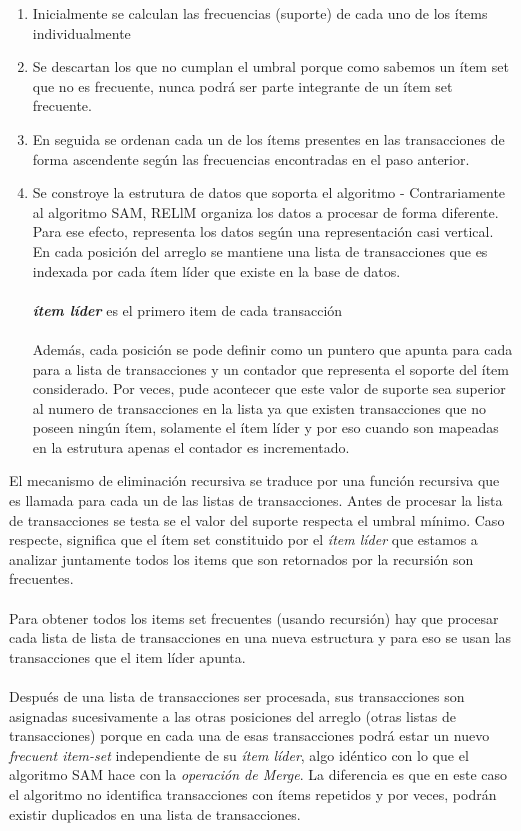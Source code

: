 \documentclass[12pt,spanish]{article}
\begin{document}
\begin{enumerate}
\item Inicialmente se calculan las frecuencias (suporte) de cada uno de los ítems individualmente 
\item Se descartan los que no cumplan el umbral porque como sabemos un ítem set que no es frecuente, nunca podrá ser parte integrante de un ítem set frecuente.
\item En seguida se ordenan cada un de los ítems presentes en las transacciones de forma ascendente según las frecuencias encontradas en el paso anterior.
\item Se constroye la estrutura de datos que soporta el algoritmo -
Contrariamente al algoritmo SAM, RELlM organiza los datos a procesar de forma diferente. Para ese efecto, representa los datos según una representación casi vertical. En cada posición del arreglo se mantiene una lista de transacciones que es indexada por cada ítem líder que existe en la base de datos.
\\\\
\textbf{\emph{ítem líder}} es el primero item de cada transacción
\\\\
 Además, cada posición se pode definir como un puntero que apunta para cada para a lista de transacciones y un contador que representa el soporte del ítem considerado. Por veces, pude acontecer que este valor de suporte sea superior al numero de transacciones en la lista ya que existen transacciones que no poseen ningún ítem, solamente el ítem líder y por eso cuando son mapeadas en la estrutura apenas el contador es incrementado. 
\end{enumerate}
El mecanismo de eliminación recursiva se traduce por una función recursiva que es llamada para cada un de las listas de transacciones. Antes de procesar la lista de transacciones se testa se el valor del suporte respecta el umbral mínimo. Caso respecte, significa que el ítem set constituido por el \emph{ítem líder} que estamos a analizar juntamente todos los items que son retornados por la recursión son frecuentes.
\\\\
Para obtener todos los items set frecuentes (usando recursión) hay que procesar cada lista de lista de transacciones en una nueva estructura y para eso se usan las transacciones que el item líder apunta.
\\\\
Después de una lista de transacciones ser procesada, sus transacciones son asignadas sucesivamente a las otras posiciones del arreglo (otras listas de transacciones) porque en cada una de esas transacciones podrá estar un nuevo \emph{frecuent item-set} independiente de su \emph{ítem líder}, algo idéntico con lo que el algoritmo SAM hace con la \emph{operación de Merge}. La diferencia es que en este caso el algoritmo no identifica transacciones con ítems repetidos y por veces, podrán existir duplicados en una lista de transacciones.   
\end{document}

